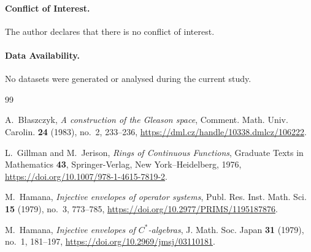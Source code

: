 \documentclass[11pt,a4paper]{amsart}
\numberwithin{equation}{section}
\theoremstyle{paperplain}
\theoremstyle{remark}
\begin{document}
\paragraph{Conflict of Interest.}
The author declares that there is no conflict of interest.

\paragraph{Data Availability.}
No datasets were generated or analysed during the current study.

\begin{thebibliography}{99}

A.~B{\l}aszczyk, \emph{A construction of the Gleason space}, Comment. Math. Univ. Carolin. \textbf{24} (1983), no.~2, 233--236, \url{https://dml.cz/handle/10338.dmlcz/106222}.

L.~Gillman and M.~Jerison, \emph{Rings of Continuous Functions}, Graduate Texts in Mathematics \textbf{43}, Springer-Verlag, New York--Heidelberg, 1976, \url{https://doi.org/10.1007/978-1-4615-7819-2}.

M.~Hamana, \emph{Injective envelopes of operator systems}, Publ. Res. Inst. Math. Sci. \textbf{15} (1979), no.~3, 773--785, \url{https://doi.org/10.2977/PRIMS/1195187876}.

M.~Hamana, \emph{Injective envelopes of $C^*$-algebras}, J. Math. Soc. Japan \textbf{31} (1979), no.~1, 181--197, \url{https://doi.org/10.2969/jmsj/03110181}.

\end{thebibliography}
\end{document}
